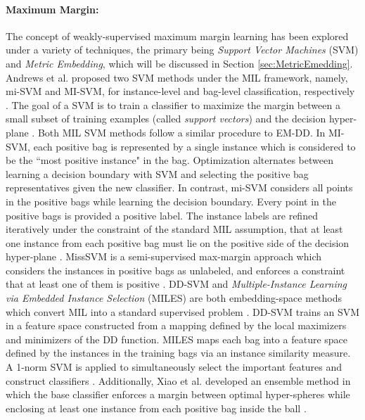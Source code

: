 \paragraph{Maximum Margin:}
The concept of weakly-supervised maximum margin learning has been explored under a variety of techniques, the primary being \textit{Support Vector Machines} (SVM) and \textit{Metric Embedding}, which will be discussed in Section \ref{sec:MetricEmedding}.  Andrews et al. proposed two SVM methods under the MIL framework, namely, mi-SVM and MI-SVM, for instance-level and bag-level classification,  respectively \citep{Carbonneau2016MILSurvey,Du2017Thesis,Jiao2017Thesis}.  The goal of a SVM is to train a classifier to maximize the margin between a small subset of training examples (called \textit{support vectors}) and the decision hyper-plane \citep{Murphy2012}.  Both MIL SVM methods follow a similar procedure to EM-DD.  In MI-SVM, each positive bag is represented by a single instance which is considered to be the ``most positive instance" in the bag. Optimization alternates between learning a decision boundary with SVM and selecting the positive bag representatives given the new classifier. In contrast, mi-SVM considers all points in the positive bags while learning the decision boundary.  Every point in the positive bags is provided a positive label.  The instance labels are refined iteratively under the constraint of the standard MIL assumption, that at least one instance from each positive bag must lie on the positive side of the decision hyper-plane \citep{Cao2016VehicleDetectionMIL}.  MissSVM is a semi-supervised max-margin approach which considers the instances in positive bags as unlabeled, and enforces a constraint that at least one of them is positive \citep{Zhou2007MissSVM}.  DD-SVM  and \textit{Multiple-Instance Learning via Embedded Instance Selection} (MILES) are both embedding-space methods which convert MIL into a standard supervised problem \citep{Chen2006MILES}.  DD-SVM trains an SVM in a feature space constructed from a mapping defined by the local maximizers and minimizers of the DD function.  MILES maps each bag into a feature space defined by the instances in the training bags via an instance similarity measure. A 1-norm SVM is applied to simultaneously select the important features and construct classifiers \citep{RuizMunoz2015MILBirdsongClassification}. Additionally, Xiao et al. developed an ensemble method in which the base classifier enforces a margin between optimal hyper-spheres while enclosing at least one instance from each positive bag inside the ball \citep{Xiao2017SphereMIL}. 


